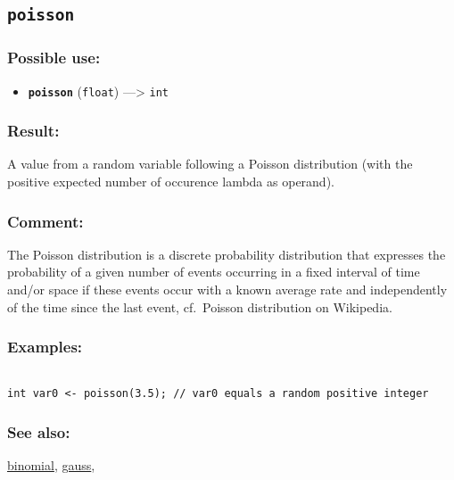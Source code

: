 \documentclass[]{book}
\providecommand{\tightlist}{%
  \setlength{\itemsep}{0pt}\setlength{\parskip}{0pt}}
\theoremstyle{definition}
\theoremstyle{definition}
\theoremstyle{definition}
\theoremstyle{remark}
\begin{document}
\subsection{\texorpdfstring{\texttt{poisson}}{poisson}}\label{poisson}

\subsubsection{Possible use:}\label{possible-use-412}

\begin{itemize}
\tightlist
\item
  \textbf{\texttt{poisson}} (\texttt{float}) ---\textgreater{}
  \texttt{int}
\end{itemize}

\subsubsection{Result:}\label{result-398}

A value from a random variable following a Poisson distribution (with
the positive expected number of occurence lambda as operand).

\subsubsection{Comment:}\label{comment-78}

The Poisson distribution is a discrete probability distribution that
expresses the probability of a given number of events occurring in a
fixed interval of time and/or space if these events occur with a known
average rate and independently of the time since the last event,
cf.~Poisson distribution on Wikipedia.

\subsubsection{Examples:}\label{examples-286}

\begin{verbatim}
 
int var0 <- poisson(3.5); // var0 equals a random positive integer
\end{verbatim}

\subsubsection{See also:}\label{see-also-165}

\href{OperatorsBC\#binomial}{binomial},
\href{OperatorsDH\#gauss}{gauss},
\end{document}
